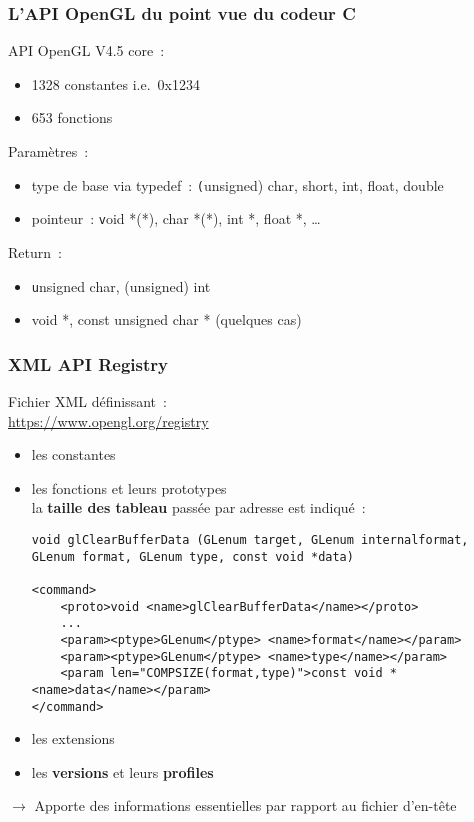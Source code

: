 
\begin{frame}
  \frametitle{L'API OpenGL du point vue du codeur C}
  API OpenGL V4.5 core~: %
  \begin{itemize}
  \item 1328 constantes \small{i.e.\ 0x1234} %
  \item 653 fonctions \\[.5em] %
  \end{itemize}
  Paramètres~:
  \begin{itemize}
  \item type de base via typedef~: {\texttt (unsigned) char, short, int, float, double}
  \item pointeur~: {\texttt void *(*), char *(*), int *, float *, \ldots} \\[.5em] %
  \end{itemize}
  Return~:
  \begin{itemize}
  \item {\texttt unsigned char, (unsigned) int}
  \item {void *, const unsigned char *} {\tiny (quelques cas)}
  \end{itemize}
\end{frame}

\begin{frame}[fragile]
  \frametitle{XML API Registry}
  Fichier XML définissant~: \\
  {\tiny \url{https://www.opengl.org/registry}} \\
  \begin{itemize}
    \item les constantes
    \item les fonctions et leurs prototypes \\
      \scriptsize{la \textbf{taille des tableau} passée par adresse est indiqué~:}
      {\tiny%
\begin{verbatim}
void glClearBufferData (GLenum target, GLenum internalformat, GLenum format, GLenum type, const void *data)

<command>
    <proto>void <name>glClearBufferData</name></proto>
    ...
    <param><ptype>GLenum</ptype> <name>format</name></param>
    <param><ptype>GLenum</ptype> <name>type</name></param>
    <param len="COMPSIZE(format,type)">const void *<name>data</name></param>
</command>
\end{verbatim}}
    \item les extensions
    \item les \textbf{versions} et leurs \textbf{profiles}
  \end{itemize}
  \centerline{\alert{$\longrightarrow$ Apporte des informations essentielles par rapport au fichier d'en-tête}}
\end{frame}

